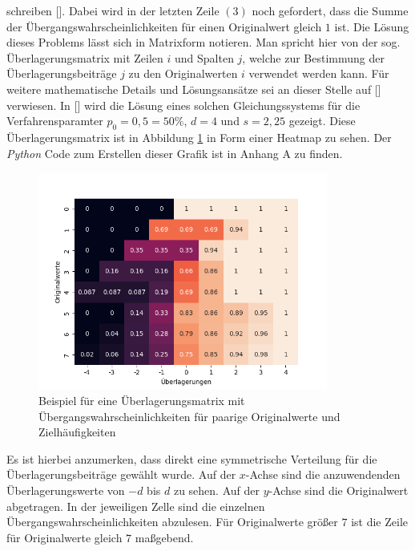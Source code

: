 schreiben [\cite{Höhne}]. Dabei wird in der letzten Zeile $(3)$ noch gefordert, dass die Summe der Übergangswahrscheinlichkeiten für einen Originalwert gleich $1$ ist. Die Lösung dieses Problems lässt sich in Matrixform notieren. Man spricht hier von der sog. Überlagerungsmatrix mit Zeilen $i$ und Spalten $j$, welche zur Bestimmung der Überlagerungsbeiträge $j$ zu den Originalwerten $i$ verwendet werden kann. Für weitere mathematische Details und Lösungsansätze sei an dieser Stelle auf [\cite{Giessing}] verwiesen. In [\cite{Höhne}] wird die Lösung eines solchen Gleichungssystems für die Verfahrensparamter $p_0 = 0,5 = 50\%$, $d = 4$ und $s = 2,25$ gezeigt. Diese Überlagerungsmatrix ist in Abbildung \ref{matrix_plot} in Form einer Heatmap zu sehen. Der \textit{Python} Code zum Erstellen dieser Grafik ist in Anhang A zu finden.

\begin{figure}[H]
    \begin{center}
        \includegraphics[width=0.85\textwidth]{img/matrix.png}
        \caption{Beispiel für eine Überlagerungsmatrix mit Übergangswahrscheinlichkeiten für paarige Originalwerte und Zielhäufigkeiten}
        \label{matrix_plot}
    \end{center}
\end{figure}

Es ist hierbei anzumerken, dass direkt eine symmetrische Verteilung für die Überlagerungsbeiträge gewählt wurde. Auf der $x$-Achse sind die anzuwendenden Überlagerungswerte von $-d$ bis $d$ zu sehen. Auf der $y$-Achse sind die Originalwert abgetragen. In der jeweiligen Zelle sind die einzelnen Übergangswahrscheinlichkeiten abzulesen. Für Originalwerte  grö\ss er $7$ ist die Zeile für Originalwerte gleich $7$ ma\ss gebend.


